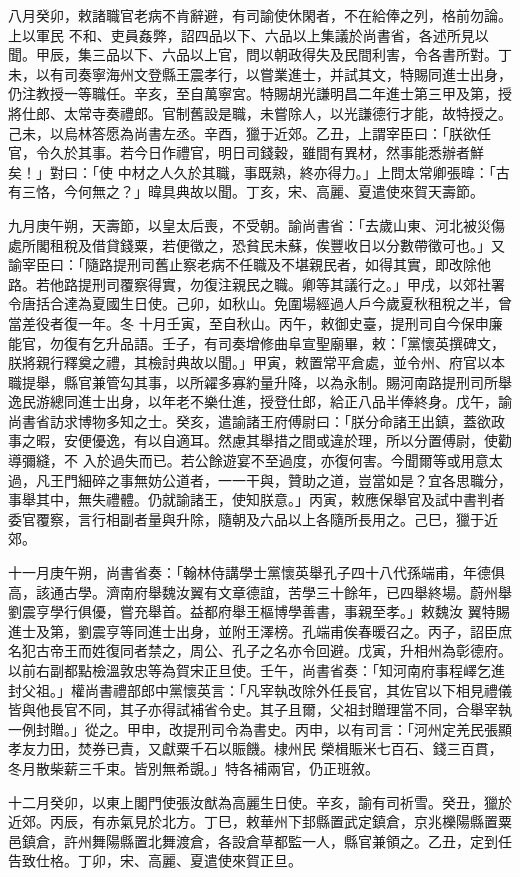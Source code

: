 \begin{pinyinscope}
 八月癸卯，敕諸職官老病不肯辭避，有司諭使休閑者，不在給俸之列，格前勿論。上以軍民
 不和、吏員姦弊，詔四品以下、六品以上集議於尚書省，各述所見以聞。甲辰，集三品以下、六品以上官，問以朝政得失及民間利害，令各書所對。丁未，以有司奏寧海州文登縣王震孝行，以嘗業進士，并試其文，特賜同進士出身，仍注教授一等職任。辛亥，至自萬寧宮。特賜胡光謙明昌二年進士第三甲及第，授將仕郎、太常寺奏禮郎。官制舊設是職，未嘗除人，以光謙德行才能，故特授之。己未，以烏林答愿為尚書左丞。辛酉，獵于近郊。乙丑，上謂宰臣曰：「朕欲任官，令久於其事。若今日作禮官，明日司錢穀，雖間有異材，然事能悉辦者鮮矣！」對曰：「使
 中材之人久於其職，事既熟，終亦得力。」上問太常卿張暐：「古有三恪，今何無之？」暐具典故以聞。丁亥，宋、高麗、夏遣使來賀天壽節。



 九月庚午朔，天壽節，以皇太后喪，不受朝。諭尚書省：「去歲山東、河北被災傷處所閣租稅及借貸錢粟，若便徵之，恐貧民未蘇，俟豐收日以分數帶徵可也。」又諭宰臣曰：「隨路提刑司舊止察老病不任職及不堪親民者，如得其實，即改除他路。若他路提刑司覆察得實，勿復注親民之職。卿等其議行之。」甲戌，以郊社署令唐括合達為夏國生日使。己卯，如秋山。免圍場經過人戶今歲夏秋租稅之半，曾當差役者復一年。冬
 十月壬寅，至自秋山。丙午，敕御史臺，提刑司自今保申廉能官，勿復有乞升品語。壬子，有司奏增修曲阜宣聖廟畢，敕：「黨懷英撰碑文，朕將親行釋奠之禮，其檢討典故以聞。」甲寅，敕置常平倉處，並令州、府官以本職提舉，縣官兼管勾其事，以所糴多寡約量升降，以為永制。賜河南路提刑司所舉逸民游總同進士出身，以年老不樂仕進，授登仕郎，給正八品半俸終身。戊午，諭尚書省訪求博物多知之士。癸亥，遣諭諸王府傅尉曰：「朕分命諸王出鎮，蓋欲政事之暇，安便優逸，有以自適耳。然慮其舉措之間或違於理，所以分置傅尉，使勸導彌縫，不
 入於過失而已。若公餘遊宴不至過度，亦復何害。今聞爾等或用意太過，凡王門細碎之事無妨公道者，一一干與，贊助之道，豈當如是？宜各思職分，事舉其中，無失禮體。仍就諭諸王，使知朕意。」丙寅，敕應保舉官及試中書判者委官覆察，言行相副者量與升除，隨朝及六品以上各隨所長用之。己巳，獵于近郊。



 十一月庚午朔，尚書省奏：「翰林侍講學士黨懷英舉孔子四十八代孫端甫，年德俱高，該通古學。濟南府舉魏汝翼有文章德誼，苦學三十餘年，已四舉終場。蔚州舉劉震亨學行俱優，嘗充舉首。益都府舉王樞博學善書，事親至孝。」敕魏汝
 翼特賜進士及第，劉震亨等同進士出身，並附王澤榜。孔端甫俟春暖召之。丙子，詔臣庶名犯古帝王而姓復同者禁之，周公、孔子之名亦令回避。戊寅，升相州為彰德府。以前右副都點檢溫敦忠等為賀宋正旦使。壬午，尚書省奏：「知河南府事程嶧乞進封父祖。」權尚書禮部郎中黨懷英言：「凡宰執改除外任長官，其佐官以下相見禮儀皆與他長官不同，其子亦得試補省令史。其子且爾，父祖封贈理當不同，合舉宰執一例封贈。」從之。甲申，改提刑司令為書史。丙申，以有司言：「河州定羌民張顯孝友力田，焚券已責，又獻粟千石以賑饑。棣州民
 榮楫賑米七百石、錢三百貫，冬月散柴薪三千束。皆別無希覬。」特各補兩官，仍正班敘。



 十二月癸卯，以東上閣門使張汝猷為高麗生日使。辛亥，諭有司祈雪。癸丑，獵於近郊。丙辰，有赤氣見於北方。丁巳，敕華州下邽縣置武定鎮倉，京兆櫟陽縣置粟邑鎮倉，許州舞陽縣置北舞渡倉，各設倉草都監一人，縣官兼領之。乙丑，定到任告致仕格。丁卯，宋、高麗、夏遣使來賀正旦。



\end{pinyinscope}
